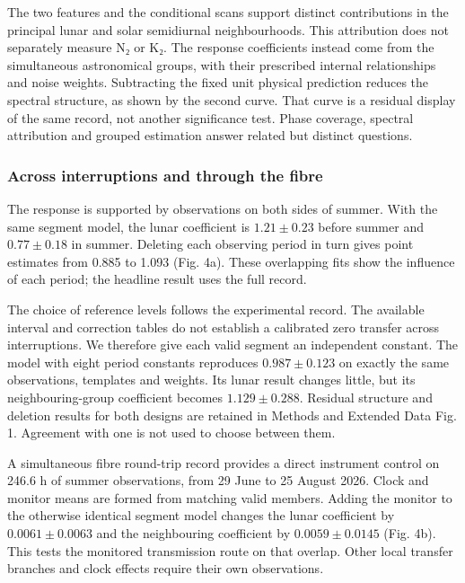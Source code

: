 \documentclass[
  10pt,
  a4paper,
]{article}
\begin{document}
The two features and the conditional scans support distinct
contributions in the principal lunar and solar semidiurnal
neighbourhoods. This attribution does not separately measure N₂ or K₂.
The response coefficients instead come from the simultaneous
astronomical groups, with their prescribed internal relationships and
noise weights. Subtracting the fixed unit physical prediction reduces
the spectral structure, as shown by the second curve. That curve is a
residual display of the same record, not another significance test.
Phase coverage, spectral attribution and grouped estimation answer
related but distinct questions.

\hypertarget{across-interruptions-and-through-the-fibre}{%
\subsubsection{Across interruptions and through the
fibre}\label{across-interruptions-and-through-the-fibre}}

The response is supported by observations on both sides of summer. With
the same segment model, the lunar coefficient is \(1.21\pm0.23\) before
summer and \(0.77\pm0.18\) in summer. Deleting each observing period in
turn gives point estimates from 0.885 to 1.093 (Fig. 4a). These
overlapping fits show the influence of each period; the headline result
uses the full record.

The choice of reference levels follows the experimental record. The
available interval and correction tables do not establish a calibrated
zero transfer across interruptions. We therefore give each valid segment
an independent constant. The model with eight period constants
reproduces \(0.987\pm0.123\) on exactly the same observations, templates
and weights. Its lunar result changes little, but its neighbouring-group
coefficient becomes \(1.129\pm0.288\). Residual structure and deletion
results for both designs are retained in Methods and Extended Data Fig.
1. Agreement with one is not used to choose between them.

A simultaneous fibre round-trip record provides a direct instrument
control on 246.6 h of summer observations, from 29 June to 25 August
2026. Clock and monitor means are formed from matching valid members.
Adding the monitor to the otherwise identical segment model changes the
lunar coefficient by \(0.0061\pm0.0063\) and the neighbouring
coefficient by \(0.0059\pm0.0145\) (Fig. 4b). This tests the monitored
transmission route on that overlap. Other local transfer branches and
clock effects require their own observations.
\end{document}
